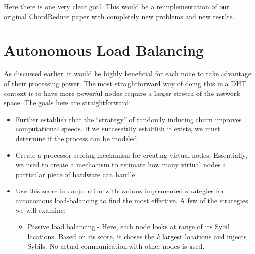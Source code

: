 Here there is one very clear goal.
This would be a reimplementation of our original ChordReduce paper with completely new problems and new results.



\section{Autonomous Load Balancing}
As discussed earlier, it would be highly beneficial for each node to take advantage of their processing power.
The most straightforward way of doing this in a DHT context is to have more powerful nodes acquire a larger stretch of the network space.
The goals here are straightforward:

\begin{itemize}
	\item Further establish that the ``strategy'' of randomly inducing churn improves computational speeds.
	If we successfully establish it exists,  we must determine if the process can be modeled.%
	\item Create a processor scoring mechanism for creating virtual nodes.  
	Essentially, we need to create a mechanism to estimate how many virtual nodes a particular piece of hardware can handle.
	\item Use this score in conjunction with various implemented strategies for autonomous load-balancing to find the most effective.
	A few of the strategies we will examine:
	\begin{itemize}
		\item Passive load balancing -  Here, each node looks at range of its Sybil locations.
		Based on its score, it choses the $k$ largest locations and injects Sybils.
		No actual communication with other nodes is used.

\end{itemize}
\end{itemize}
